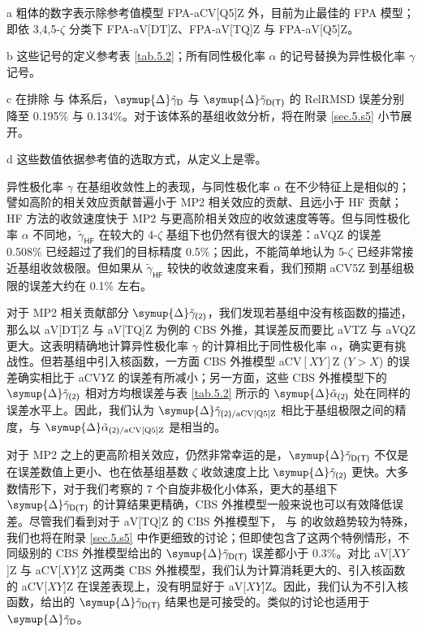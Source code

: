 \begin{table}[!ht]
{\begin{tabular}{cld{2.4}d{2.4}d{2.4}d{2.4}}
    \bottomrule
    \end{tabular}
}{
    \raggedright
    \item[a] 粗体的数字表示除参考值模型 FPA-aCV[Q5]Z 外，目前为止最佳的 FPA 模型；即依 3,4,5-$\zeta$ 分类下 FPA-aV[DT]Z、FPA-aV[TQ]Z 与 FPA-aV[Q5]Z。
    \item[b] 这些记号的定义参考表 \ref{tab.5.2}；所有同性极化率 $\alpha$ 的记号替换为异性极化率 $\gamma$ 记号。
    \item[c] 在排除  与  体系后，$\symup{\Delta} \tilde \gamma_\textsf{D}$ 与 $\symup{\Delta} \tilde \gamma_\textsf{D(T)}$ 的 RelRMSD 误差分别降至 0.195\% 与 0.134\%。对于该体系的基组收敛分析，将在附录 \ref{sec.5.s5} 小节展开。
    \item[d] 这些数值依据参考值的选取方式，从定义上是零。
}
\end{table}

异性极化率 $\gamma$ 在基组收敛性上的表现，与同性极化率 $\alpha$ 在不少特征上是相似的；譬如高阶的相关效应贡献普遍小于 MP2 相关效应的贡献、且远小于 HF 贡献；HF 方法的收敛速度快于 MP2 与更高阶相关效应的收敛速度等等。但与同性极化率 $\alpha$ 不同地，$\tilde \gamma_\textsf{HF}$ 在较大的 4-$\zeta$ 基组下也仍然有很大的误差：aVQZ 的误差 0.508\% 已经超过了我们的目标精度 0.5\%；因此，不能简单地认为 5-$\zeta$ 已经非常接近基组收敛极限。但如果从 $\tilde \gamma_\textsf{HF}$ 较快的收敛速度来看，我们预期 aCV5Z 到基组极限的误差大约在 0.1\% 左右。

对于 MP2 相关贡献部分 $\symup{\Delta} \tilde \gamma_\textsf{(2)}$，我们发现若基组中没有核函数的描述，那么以 aV[DT]Z 与 aV[TQ]Z 为例的 CBS 外推，其误差反而要比 aVTZ 与 aVQZ 更大。这表明精确地计算异性极化率 $\gamma$ 的计算相比于同性极化率 $\alpha$，确实更有挑战性。但若基组中引入核函数，一方面 CBS 外推模型 aCV$[XY]$Z ($Y > X$) 的误差确实相比于 aCV$Y$Z 的误差有所减小；另一方面，这些 CBS 外推模型下的 $\symup{\Delta} \tilde \gamma_\textsf{(2)}$ 相对方均根误差与表 \ref{tab.5.2} 所示的 $\symup{\Delta} \tilde \alpha_\textsf{(2)}$ 处在同样的误差水平上。因此，我们认为 $\symup{\Delta} \tilde \gamma_{\textsf{(2)}/\text{aCV[Q5]Z}}$ 相比于基组极限之间的精度，与 $\symup{\Delta} \tilde \alpha_{\textsf{(2)}/\text{aCV[Q5]Z}}$ 是相当的。

对于 MP2 之上的更高阶相关效应，仍然非常幸运的是，$\symup{\Delta} \tilde \gamma_\textsf{D(T)}$ 不仅是在误差数值上更小、也在依基组基数 $\zeta$ 收敛速度上比 $\symup{\Delta} \tilde \gamma_\textsf{(2)}$ 更快。大多数情形下，对于我们考察的 7 个自旋非极化小体系，更大的基组下 $\symup{\Delta} \tilde \gamma_\textsf{D(T)}$ 的计算结果更精确，CBS 外推模型一般来说也可以有效降低误差。尽管我们看到对于 aV[TQ]Z 的 CBS 外推模型下， 与  的收敛趋势较为特殊，我们也将在附录 \ref{sec.5.s5} 中作更细致的讨论；但即使包含了这两个特例情形，不同级别的 CBS 外推模型给出的 $\symup{\Delta} \tilde \gamma_\textsf{D(T)}$ 误差都小于 0.3\%。对比 aV[$XY$]Z 与 aCV[$XY$]Z 这两类 CBS 外推模型，我们认为计算消耗更大的、引入核函数的 aCV[$XY$]Z 在误差表现上，没有明显好于 aV[$XY$]Z。因此，我们认为不引入核函数，给出的 $\symup{\Delta} \tilde \gamma_\textsf{D(T)}$ 结果也是可接受的。类似的讨论也适用于 $\symup{\Delta} \tilde \gamma_\textsf{D}$。

